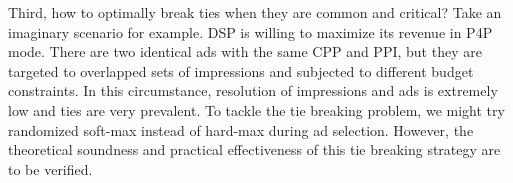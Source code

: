 \documentclass{article}
\newcommand{\sumi}{\sum\limits_i}
\newcommand{\sumj}{\sum\limits_j}
\newcommand{\sumk}{\sum\limits_k}
\newcommand{\sumij}{\sum\limits_{ij}}
\newcommand{\sx}{x_{ij}}
\newcommand{\sV}{V_{ij}}
\newcommand{\sW}{W_{ij}^{(k)}}
\newcommand{\sB}{B^{(k)}}
\newcommand{\salpha}{\alpha^{(k)}}
\newcommand{\sbeta}{\beta_i}
\newcommand{\sgamma}{\gamma_{ij}}
\newcommand{\sS}{S_{ij}}
\newcommand{\ammkpresourceconstraint}{\sumij \sx \sW(\sV) \le \sB}
\newcommand{\assignmentconstraint}{\sumj \sx \le 1}
\newcommand{\scoreconstraint}{\sbeta \ge \sS(\vec{\alpha})}
\begin{document}
Third, how to optimally break ties when they are common and critical?
Take an imaginary scenario for example.
DSP is willing to maximize its revenue in P4P mode.
There are two identical ads with the same CPP and PPI,
    but they are targeted to overlapped sets of impressions and subjected to different budget constraints.
In this circumstance, resolution of impressions and ads is extremely low and ties are very prevalent.
To tackle the tie breaking problem, we might try randomized soft-max instead of hard-max during ad selection.
However, the theoretical soundness and practical effectiveness of this tie breaking strategy are to be verified.

\clearpage




%
%
%
\end{document}
